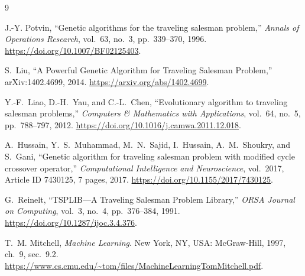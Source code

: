 \documentclass[11pt,a4paper]{article}
\begin{document}
\begin{thebibliography}{9}

J.-Y. Potvin, ``Genetic algorithms for the traveling salesman problem,''
\emph{Annals of Operations Research}, vol.~63, no.~3, pp.~339--370, 1996.
\url{https://doi.org/10.1007/BF02125403}.

S.~Liu, ``A Powerful Genetic Algorithm for Traveling Salesman Problem,''
arXiv:1402.4699, 2014. \url{https://arxiv.org/abs/1402.4699}.

Y.-F.~Liao, D.-H.~Yau, and C.-L.~Chen, ``Evolutionary algorithm to traveling
salesman problems,'' \emph{Computers \& Mathematics with Applications},
vol.~64, no.~5, pp.~788--797, 2012.
\url{https://doi.org/10.1016/j.camwa.2011.12.018}.

A.~Hussain, Y.~S.~Muhammad, M.~N.~Sajid, I.~Hussain, A.~M.~Shoukry, and
S.~Gani, ``Genetic algorithm for traveling salesman problem with modified cycle
crossover operator,'' \emph{Computational Intelligence and Neuroscience},
vol.~2017, Article ID 7430125, 7 pages, 2017.
\url{https://doi.org/10.1155/2017/7430125}.

G.~Reinelt, ``TSPLIB---A Traveling Salesman Problem Library,'' \emph{ORSA
Journal on Computing}, vol.~3, no.~4, pp.~376--384, 1991.
\url{https://doi.org/10.1287/ijoc.3.4.376}.

T.~M. Mitchell, \emph{Machine Learning}. New York, NY, USA: McGraw-Hill, 1997,
ch.~9, sec.~9.2.
\url{https://www.cs.cmu.edu/~tom/files/MachineLearningTomMitchell.pdf}.

\end{thebibliography}
\end{document}
